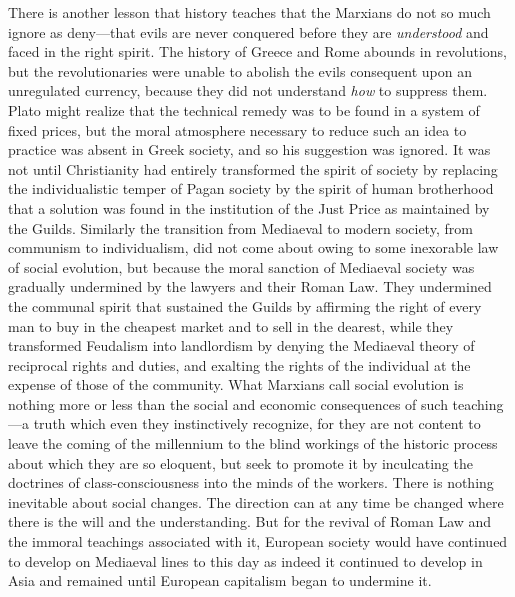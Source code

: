 \documentclass{book}
\begin{document}
There is another lesson that history teaches that the Marxians do not so much ignore as deny—that evils are never conquered before they are \emph{understood} and faced in the right spirit. The history of Greece and Rome abounds in revolutions, but the revolutionaries were unable to abolish the evils consequent upon an unregulated currency, because they did not understand \emph{how} to suppress them. Plato might realize that the technical remedy was to be found in a system of fixed prices, but the moral atmosphere necessary to reduce such an idea to practice was absent in Greek society, and so his suggestion was ignored. It was not until Christianity had entirely transformed the spirit of society by replacing the individualistic temper of Pagan society by the spirit of human brotherhood that a solution was found in the institution of the Just Price as maintained by the Guilds. Similarly the transition from Mediaeval to modern society, from communism to individualism, did not come about owing to some inexorable law of social evolution, but because the moral sanction of Mediaeval society was gradually undermined by the lawyers and their Roman Law. They undermined the communal spirit that sustained the Guilds by affirming the right of every man to buy in the cheapest market and to sell in the dearest, while they transformed Feudalism into landlordism by denying the Mediaeval theory of reciprocal rights and duties, and exalting the rights of the individual at the expense of those of the community. What Marxians call social evolution is nothing more or less than the social and economic consequences of such teaching—a truth which even they instinctively recognize, for they are not content to leave the coming of the millennium to the blind workings of the historic process about which they are so eloquent, but seek to promote it by inculcating the doctrines of class-consciousness into the minds of the workers. There is nothing inevitable about social changes. The direction can at any time be changed where there is the will and the understanding. But for the revival of Roman Law and the immoral teachings associated with it, European society would have continued to develop on Mediaeval lines to this day as indeed it continued to develop in Asia and remained until European capitalism began to undermine it.
\end{document}
